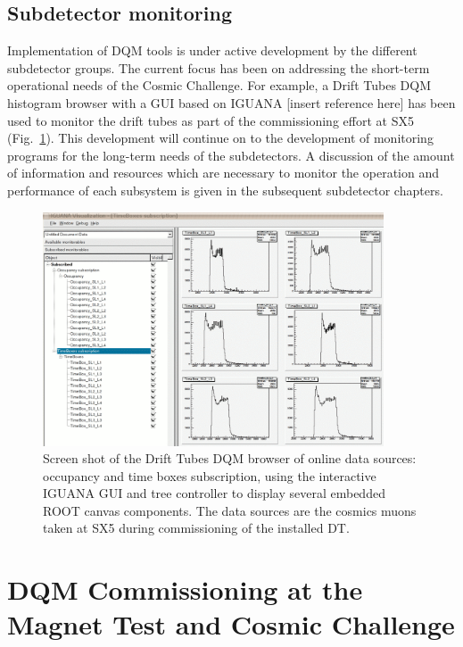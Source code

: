 \documentclass[a4paper]{cmspaper}
\begin{document}
\subsection{Subdetector monitoring}\label{sec:subdetMonitoring}

Implementation of DQM tools is under active development by
the different
subdetector groups.
The current focus has been on addressing the short-term operational
needs of the Cosmic Challenge. For example,
a Drift Tubes DQM histogram browser with
a GUI based on IGUANA [insert reference here] has been used to
monitor the drift tubes as part of the commissioning effort at SX5
(Fig.~\ref{iguana-dqm}). This development will continue
on to the development of
monitoring programs
for the long-term needs of the subdetectors. A discussion of
the amount of information and resources which are necessary to monitor the operation
and performance of each subsystem is given in the subsequent subdetector chapters.
%
%

%
\begin{figure}[!htbp]
\begin{center}
\includegraphics[width=0.9\textwidth]{iguana-dqm}
\caption{Screen shot of the Drift Tubes DQM browser of online data
sources: occupancy and time boxes subscription,
            using the interactive IGUANA  GUI and tree controller to display
            several embedded ROOT canvas components. The data sources are the cosmics muons taken at SX5
during commissioning of the installed DT.\label{iguana-dqm}}
\end{center}
\end{figure}


\section{DQM Commissioning at the Magnet Test and Cosmic Challenge} \label{sec:dqmcommissioning}
\end{document}
